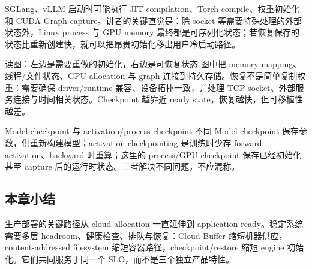 SGLang、vLLM 启动时可能执行 JIT compilation、Torch compile、权重初始化和 CUDA Graph capture。讲者的关键直觉是：除 socket 等需要特殊处理的外部状态外，Linux process 与 GPU memory 最终都是可序列化状态；若恢复保存的状态比重新创建快，就可以把昂贵初始化移出用户冷启动路径。


\begin{knowledgebox}{读图：左边是需要重做的初始化，右边是可恢复状态}
图中把 memory mapping、线程/文件状态、GPU allocation 与 graph 连接到持久存储。恢复不是简单复制权重：需要确保 driver/runtime 兼容、设备拓扑一致，并处理 TCP socket、外部服务连接与时间相关状态。Checkpoint 越靠近 ready state，恢复越快，但可移植性越差。
\end{knowledgebox}

\begin{warningbox}{Model checkpoint 与 activation/process checkpoint 不同}
Model checkpoint 保存参数，供重新构建模型；activation checkpointing 是训练时少存 forward activation、backward 时重算；这里的 process/GPU checkpoint 保存已经初始化甚至 capture 后的运行时状态。三者解决不同问题，不应混称。
\end{warningbox}

\subsection{本章小结}

生产部署的关键路径从 cloud allocation 一直延伸到 application ready。稳定系统需要多层 headroom、健康检查、排队与恢复：Cloud Buffer 缩短机器供应，content-addressed filesystem 缩短容器路径，checkpoint/restore 缩短 engine 初始化。它们共同服务于同一个 SLO，而不是三个独立产品特性。


